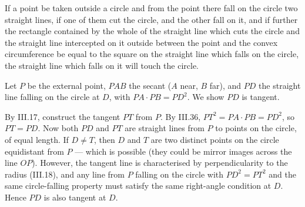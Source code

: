 \begin{claim}
\label{prop:III.37}
If a point be taken outside a circle and from the point there fall
on the circle two straight lines, if one of them cut the circle, and
the other fall on it, and if further the rectangle contained by the
whole of the straight line which cuts the circle and the straight
line intercepted on it outside between the point and the convex
circumference be equal to the square on the straight line which
falls on the circle, the straight line which falls on it will touch
the circle.
\end{claim}
\begin{evidence}
\label{ev:III.37}
Let $P$ be the external point, $PAB$ the secant ($A$ near, $B$
far), and $PD$ the straight line falling on the circle at $D$,
with $PA \cdot PB = PD^2$.  We show $PD$ is tangent.

By III.17, construct the tangent $PT$ from $P$.  By III.36, $PT^2
= PA \cdot PB = PD^2$, so $PT = PD$.  Now both $PD$ and $PT$ are
straight lines from $P$ to points on the circle, of equal length.
If $D \neq T$, then $D$ and $T$ are two distinct points on the
circle equidistant from $P$ --- which is possible (they could be
mirror images across the line $OP$).  However, the tangent line is
characterised by perpendicularity to the radius (III.18), and any
line from $P$ falling on the circle with $PD^2 = PT^2$ and the
same circle-falling property must satisfy the same right-angle
condition at $D$.  Hence $PD$ is also tangent at $D$.
\end{evidence}
